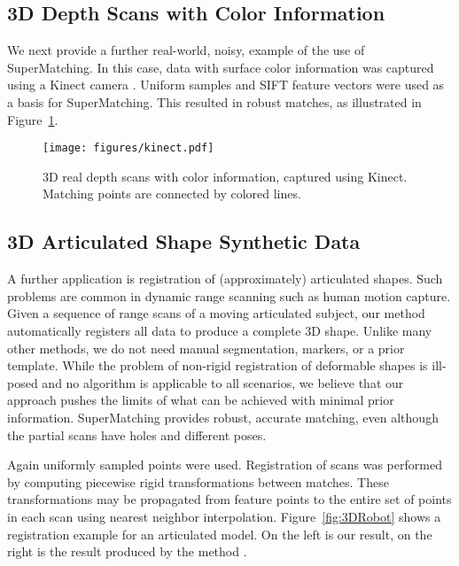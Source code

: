 \subsection{3D Depth Scans with Color Information}
\label{subsec:3dColored}

We next provide a further real-world, noisy, example of the use of SuperMatching.
In this case, data with surface color information was captured using a Kinect camera \cite{Kinect12}.
Uniform samples and SIFT feature vectors were used as a basis for SuperMatching.
This resulted in robust matches, as illustrated in Figure~\ref{fig:3DReal}.

\begin{figure}[h]
\centering
  \texttt{[image: figures/kinect.pdf]}
  \caption{3D real depth scans with color information, captured using Kinect.
    Matching points are connected by colored lines.}
\label{fig:3DReal}
\end{figure}

\subsection{3D Articulated Shape Synthetic Data}
\label{subsec:3darticulated}

A further application is registration of (approximately) articulated shapes. Such problems are common in dynamic range scanning such as human motion capture.
Given a sequence of range scans of a moving articulated subject, our method automatically registers all data to produce a complete 3D shape.
Unlike many other methods, we do not need  manual segmentation, markers, or a prior template.
While the problem of non-rigid registration of deformable shapes is ill-posed and no algorithm is applicable to all scenarios,
we believe that our approach pushes the limits of what can be achieved with minimal prior information. SuperMatching provides robust, accurate matching,
even although the partial scans have holes and different poses.

Again uniformly sampled points were used. Registration of scans was performed by computing piecewise rigid transformations between matches.
These transformations may be propagated from feature points to the entire set of points in each scan using nearest neighbor interpolation.
Figure~\ref{fig:3DRobot} shows a registration example for an articulated model.
On the left is our result, on the right is the result produced by the method \cite{Chang09}.


